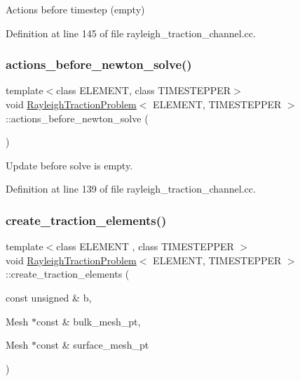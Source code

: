 Actions before timestep (empty) 



Definition at line 145 of file rayleigh\+\_\+traction\+\_\+channel.\+cc.

\mbox{\label{classRayleighTractionProblem_ad8f0e846280b0dd56f90c6d40808d3ea}} 
\subsubsection{\texorpdfstring{actions\+\_\+before\+\_\+newton\+\_\+solve()}{actions\_before\_newton\_solve()}}
{\footnotesize\ttfamily template$<$class E\+L\+E\+M\+E\+NT, class T\+I\+M\+E\+S\+T\+E\+P\+P\+ER$>$ \\
void \hyperlink{classRayleighTractionProblem}{Rayleigh\+Traction\+Problem}$<$ E\+L\+E\+M\+E\+NT, T\+I\+M\+E\+S\+T\+E\+P\+P\+ER $>$\+::actions\+\_\+before\+\_\+newton\+\_\+solve (\begin{DoxyParamCaption}{ }\end{DoxyParamCaption})\hspace{0.3cm}{\ttfamily [inline]}}



Update before solve is empty. 



Definition at line 139 of file rayleigh\+\_\+traction\+\_\+channel.\+cc.

\mbox{\label{classRayleighTractionProblem_a3a94c245abf443c436eb8a94be19a9f9}} 
\subsubsection{\texorpdfstring{create\+\_\+traction\+\_\+elements()}{create\_traction\_elements()}}
{\footnotesize\ttfamily template$<$class E\+L\+E\+M\+E\+NT , class T\+I\+M\+E\+S\+T\+E\+P\+P\+ER $>$ \\
void \hyperlink{classRayleighTractionProblem}{Rayleigh\+Traction\+Problem}$<$ E\+L\+E\+M\+E\+NT, T\+I\+M\+E\+S\+T\+E\+P\+P\+ER $>$\+::create\+\_\+traction\+\_\+elements (\begin{DoxyParamCaption}\item[{const unsigned \&}]{b,  }\item[{Mesh $\ast$const \&}]{bulk\+\_\+mesh\+\_\+pt,  }\item[{Mesh $\ast$const \&}]{surface\+\_\+mesh\+\_\+pt }\end{DoxyParamCaption})}



